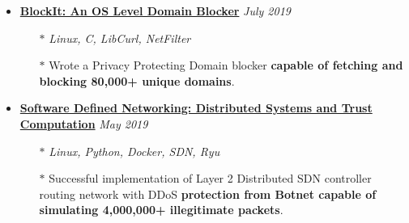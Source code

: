 \documentclass[10pt,a4paper]{article}
\begin{document}
\begin{itemize}[noitemsep,nolistsep]
		\item{\textbf{\href{https://github.com/r0ck3r008/blockit}{BlockIt: An OS Level Domain Blocker}} \hfill \textit{July 2019}}
			\begin{itemize}[leftmargin=*]
				\setlength\itemsep{-0.25em}
				\item[$\ast$]{\textit{Linux, C, LibCurl, NetFilter}}
				\item[$\ast$]{Wrote a Privacy Protecting Domain blocker \textbf{capable of fetching and blocking 80,000+ unique domains}.}
			\end{itemize}

		\item{\textbf{\href{https://gitlab.com/r0ck3r008/sdn-proj}{Software Defined Networking: Distributed Systems and Trust Computation}} \hfill \textit{May 2019}}
			\begin{itemize}[leftmargin=*]
				\setlength\itemsep{-0.25em}
				\item[$\ast$]{\textit{Linux, Python, Docker, SDN, Ryu}}
				\item[$\ast$]{Successful implementation of Layer 2 Distributed SDN controller routing network with DDoS \textbf{protection from Botnet capable of simulating 4,000,000+ illegitimate packets}.}
			\end{itemize}

	\end{itemize}
\end{document}

